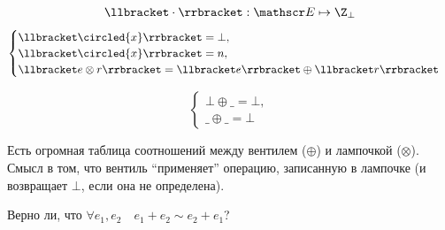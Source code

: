 $$ \llbracket \cdot \rrbracket : \mathscr E \mapsto \Z_\bot $$
$$
\begin{cases}
	\llbracket \circled{x} \rrbracket = \bot, \\
	\llbracket \circled{x} \rrbracket = n, \\
	\llbracket e \otimes r \rrbracket = \llbracket e \rrbracket \oplus \llbracket r \rrbracket
\end{cases} $$

$$
\begin{cases}
	\bot \oplus \_ = \bot, \\
	\_ \oplus \_ = \bot
\end{cases} $$

Есть огромная таблица соотношений между вентилем ($ \oplus $) и лампочкой ($ \otimes $).
Смысл в том, что вентиль ``применяет'' операцию, записанную в лампочке (и возвращает $ \bot $, если
она не определена).

Верно ли, что $ \forall e_1, e_2 \quad e_1 + e_2 \sim e_2 + e_1 $?
